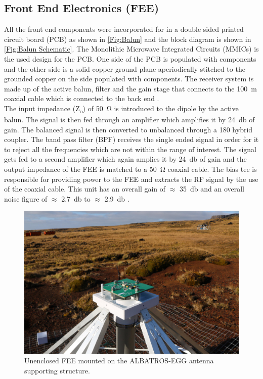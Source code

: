 \documentclass{ws-jai}
\begin{document}
\subsection{Front End Electronics (FEE)}
All the front end components were incorporated for in a double sided printed circuit board (PCB) as shown in \autoref{Fig:Balun} and the block diagram is shown in \autoref{Fig:Balun Schematic}. The Monolithic Microwave Integrated Circuits (MMICs) is the used design for the PCB. One side of the PCB is populated with components and the other side is a solid copper ground plane aperiodically stitched to the grounded copper on the side populated with components. The receiver system is made up of the active balun, filter and the gain stage that connects to the \SI{100}{\metre} coaxial cable which is connected to the back end \cite{2012PASP..124.1090H}.\\ 
The input impedance (Z\textsubscript{o}) of \SI{50}{\ohm} is introduced to the dipole by the active balun. The signal is then fed through an amplifier which amplifies it by \SI{+24}{\decibel} of gain. The balanced signal is then converted to unbalanced through a 180 \degree hybrid coupler. The band pass filter (BPF) receives the single ended signal in order for it to reject all the frequencies which are not within the range of interest. The signal gets fed to a second amplifier which again amplies it by \SI{+24}{\decibel} of gain and the output impedance of the FEE is matched to a \SI{50}{\ohm} coaxial cable. The bias tee is responsible for providing power to the FEE and extracts the RF signal by the use of the coaxial cable. This unit has an overall gain of $\approx$ \SI{35}{\decibel} and an overall noise figure of $\approx$ \SI{2.7}{\decibel} to $\approx$ \SI{2.9}{\decibel} \cite{Memo35}.

\begin{figure}[h]
	\begin{center}
		\includegraphics[width=0.5\linewidth]{Figures/balun.jpg}
		\caption{Unenclosed FEE mounted on the ALBATROS-EGG antenna supporting structure.} 
		\label{Fig:Balun}
	\end{center}
\end{figure}
\end{document}
